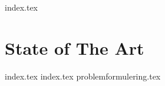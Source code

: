 {index.tex}
\chapter{State of The Art}\label{cha:sota}
{index.tex}
{index.tex}
{problemformulering.tex}
